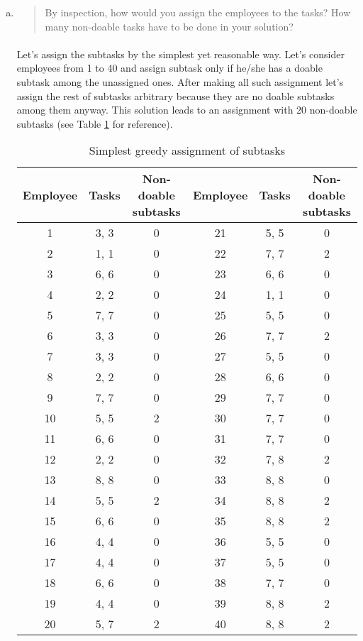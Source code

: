 \begin{enumerate}[(a)]
\item\begin{quote}By inspection, how would you assign the employees to the tasks? How many
non-doable tasks have to be done in your solution?\end{quote}

	\paragraph{}
	Let's assign the subtasks by the simplest yet reasonable way. Let's consider employees from 1 to 40 and assign subtask only if he/she has a doable subtask among the unassigned ones. After making all such assignment let's assign the rest of subtasks arbitrary because they are no doable subtasks among them anyway. This solution leads to an assignment with 20 non-doable subtasks (see Table \ref{greedy-3-a} for reference).

\begin{table}[H]
	\centering
	\caption{Simplest greedy assignment of subtasks}
	\begin{tabular}{ccc||ccc}\hline
Employee & Tasks & Non-doable subtasks & Employee & Tasks & Non-doable subtasks \\ \hline
1 & 3, 3 & 0 & 21 & 5, 5 & 0 \\
2 & 1, 1 & 0 & 22 & 7, 7 & 2 \\
3 & 6, 6 & 0 & 23 & 6, 6 & 0 \\
4 & 2, 2 & 0 & 24 & 1, 1 & 0 \\
5 & 7, 7 & 0 & 25 & 5, 5 & 0 \\
6 & 3, 3 & 0 & 26 & 7, 7 & 2 \\
7 & 3, 3 & 0 & 27 & 5, 5 & 0 \\
8 & 2, 2 & 0 & 28 & 6, 6 & 0 \\
9 & 7, 7 & 0 & 29 & 7, 7 & 0 \\
10 & 5, 5 & 2 & 30 & 7, 7 & 0 \\
11 & 6, 6 & 0 & 31 & 7, 7 & 0 \\
12 & 2, 2 & 0 & 32 & 7, 8 & 2 \\
13 & 8, 8 & 0 & 33 & 8, 8 & 0 \\
14 & 5, 5 & 2 & 34 & 8, 8 & 2 \\
15 & 6, 6 & 0 & 35 & 8, 8 & 2 \\
16 & 4, 4 & 0 & 36 & 5, 5 & 0 \\
17 & 4, 4 & 0 & 37 & 5, 5 & 0 \\
18 & 6, 6 & 0 & 38 & 7, 7 & 0 \\
19 & 4, 4 & 0 & 39 & 8, 8 & 2 \\
20 & 5, 7 & 2 & 40 & 8, 8 & 2 \\
\hline
	\end{tabular}
	\label{greedy-3-a}
\end{table}


\end{enumerate}
